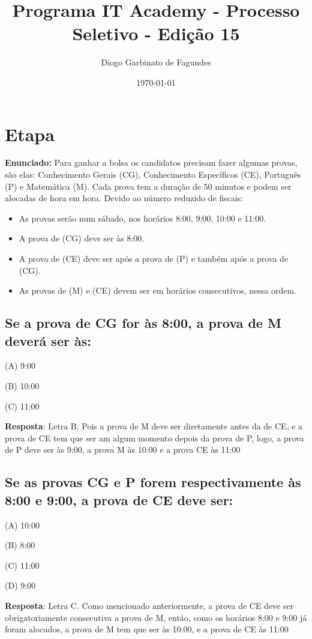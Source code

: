 \documentclass[11pt]{article}
\author{Diogo Garbinato de Fagundes}
\date{\today}
\title{Programa IT Academy - Processo Seletivo - Edição 15}
\begin{document}
\maketitle
\tableofcontents


\section{Etapa}
\label{sec:org595af53}
\textbf{Enunciado:} Para ganhar a bolsa os candidatos precisam fazer algumas provas, são elas:
Conhecimento Gerais (CG), Conhecimento Específicos (CE), Português (P) e Matemática
(M). Cada prova tem a duração de 50 minutos e podem ser alocadas de hora em hora.
Devido ao número reduzido de fiscais:

\begin{itemize}
\item As provas serão num sábado, nos horários 8:00, 9:00, 10:00 e 11:00.
\item A prova de (CG) deve ser às 8:00.
\item A prova de (CE) deve ser após a prova de (P) e também após a prova de (CG).
\item As provas de (M) e (CE) devem ser em horários consecutivos, nessa ordem.
\end{itemize}

\subsection{Se a prova de CG for às 8:00, a prova de M deverá ser às:}
\label{sec:orgaa0fead}

(A) 9:00

(B) 10:00

(C) 11:00

\textbf{Resposta}: Letra B. Pois a prova de M deve ser diretamente antes da de CE, e a prova de CE tem que ser am algum momento depois da prova de P, logo, a prova de P deve ser às 9:00, a prova M às 10:00 e a prova CE às 11:00

\subsection{Se as provas CG e P forem respectivamente às 8:00 e 9:00, a prova de CE deve ser:}
\label{sec:org0bdc8b8}

(A) 10:00

(B) 8:00

(C) 11:00

(D) 9:00

\textbf{Resposta}: Letra C. Como mencionado anteriormente, a prova de CE deve ser obrigatoriamente consecutiva a prova de M, então, como os horários 8:00 e 9:00 já foram alocados, a prova de M tem que ser às 10:00, e a prova de CE às 11:00
\end{document}
